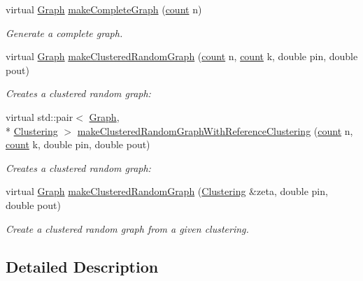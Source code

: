 \begin{DoxyCompactItemize}
virtual \hyperlink{class_networ_kit_1_1_graph}{Graph} \hyperlink{class_networ_kit_1_1_graph_generator_a8dcd5d1f75f5f04d1cbf98dd60616f31}{make\-Complete\-Graph} (\hyperlink{namespace_networ_kit_a76b399edfa50ae72e4aa86007aaa800a}{count} n)
\begin{DoxyCompactList}\small\item\em Generate a complete graph. \end{DoxyCompactList}\item 
virtual \hyperlink{class_networ_kit_1_1_graph}{Graph} \hyperlink{class_networ_kit_1_1_graph_generator_ace5f942042a6805eb8cad512376ec641}{make\-Clustered\-Random\-Graph} (\hyperlink{namespace_networ_kit_a76b399edfa50ae72e4aa86007aaa800a}{count} n, \hyperlink{namespace_networ_kit_a76b399edfa50ae72e4aa86007aaa800a}{count} k, double pin, double pout)
\begin{DoxyCompactList}\small\item\em Creates a clustered random graph\-: \end{DoxyCompactList}\item 
virtual std\-::pair$<$ \hyperlink{class_networ_kit_1_1_graph}{Graph}, \\*
\hyperlink{class_networ_kit_1_1_clustering}{Clustering} $>$ \hyperlink{class_networ_kit_1_1_graph_generator_a51347c6d014f63a0ad0807ba7f96a6be}{make\-Clustered\-Random\-Graph\-With\-Reference\-Clustering} (\hyperlink{namespace_networ_kit_a76b399edfa50ae72e4aa86007aaa800a}{count} n, \hyperlink{namespace_networ_kit_a76b399edfa50ae72e4aa86007aaa800a}{count} k, double pin, double pout)
\begin{DoxyCompactList}\small\item\em Creates a clustered random graph\-: \end{DoxyCompactList}\item 
virtual \hyperlink{class_networ_kit_1_1_graph}{Graph} \hyperlink{class_networ_kit_1_1_graph_generator_a6c66c5379190e4544018a61950abdb15}{make\-Clustered\-Random\-Graph} (\hyperlink{class_networ_kit_1_1_clustering}{Clustering} \&zeta, double pin, double pout)
\begin{DoxyCompactList}\small\item\em Create a clustered random graph from a given clustering. \end{DoxyCompactList}\end{DoxyCompactItemize}


\subsection{Detailed Description}


